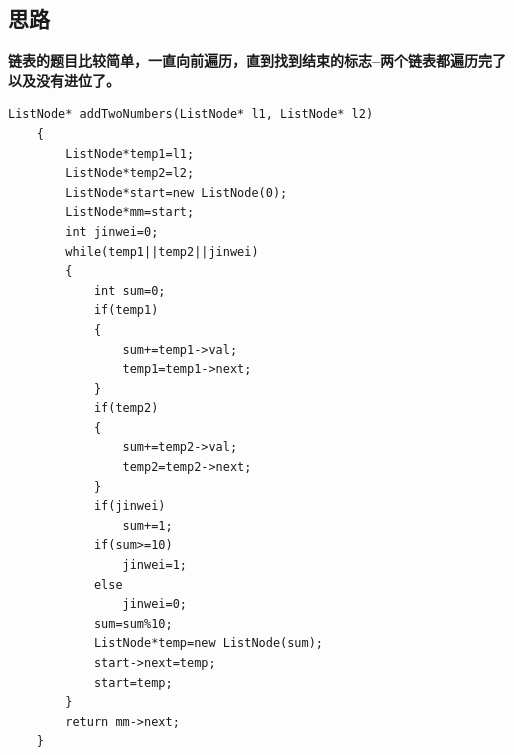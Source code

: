 \documentclass[a4paper, 11pt]{article} %
\begin{document}
\begin{spacing}{1.5}
\section*{思路}
\textbf{\color{blue}链表的题目比较简单，一直向前遍历，直到找到结束的标志--两个链表都遍历完了以及没有进位了。}
\begin{lstlisting}[caption={},frame=shadowbox]
    ListNode* addTwoNumbers(ListNode* l1, ListNode* l2)
    {
        ListNode*temp1=l1;
        ListNode*temp2=l2;
        ListNode*start=new ListNode(0);
        ListNode*mm=start;
        int jinwei=0;
        while(temp1||temp2||jinwei)
        {
            int sum=0;
            if(temp1)
            {
                sum+=temp1->val;
                temp1=temp1->next;
            }
            if(temp2)
            {
                sum+=temp2->val;
                temp2=temp2->next;
            }
            if(jinwei)
                sum+=1;
            if(sum>=10)
                jinwei=1;
            else
                jinwei=0;
            sum=sum%10;
            ListNode*temp=new ListNode(sum);
            start->next=temp;
            start=temp;
        }
        return mm->next;
    }
\end{lstlisting}



\end{spacing}
\end{document}
